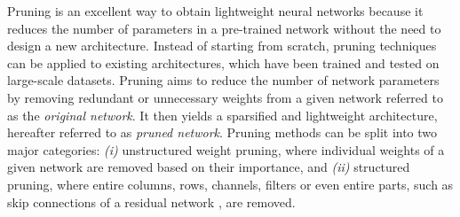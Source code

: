 

Pruning is an excellent way to obtain lightweight neural networks because it
reduces the number of parameters in a pre-trained network without the need to
design a new architecture. Instead of starting from scratch, pruning techniques
can be applied to existing architectures, which have been trained and tested on
large-scale datasets. Pruning aims to reduce the number of network parameters by
removing redundant or unnecessary weights from a given network referred to as
the \textit{original network}. It then yields a sparsified and lightweight
architecture, hereafter referred to as \textit{pruned network}. Pruning methods
can be split into two major categories: \textit{(i)} unstructured weight
pruning, where individual weights of a given network are removed based on their
importance, and \textit{(ii)} structured pruning, where entire columns, rows,
channels, filters or even entire parts, such as skip connections of a residual
network \cite{DBLP:conf/cvpr/HeZRS16}, are removed. \\


